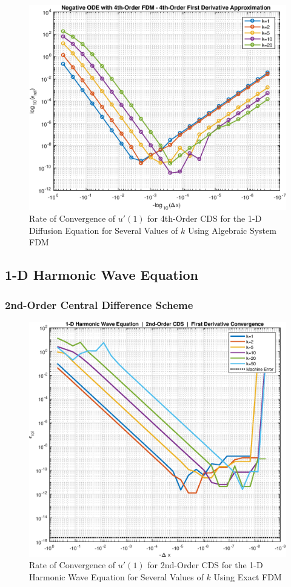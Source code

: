 \documentclass[10pt]{article}		%
\numberwithin{equation}{section}
\begin{document}
\begin{figure}[H]
	\begin{center}
		\includegraphics[width = 0.5\linewidth]{negative_ode_order_4_fd_order_4}
		\caption{Rate of Convergence of $u'(1)$ for 4th-Order CDS for the 1-D Diffusion Equation for Several Values of $k$ Using Algebraic System FDM}	
	\end{center}
\end{figure}

\subsection{1-D Harmonic Wave Equation}

\subsubsection{2nd-Order Central Difference Scheme}

\begin{figure}[H]
	\begin{center}
		\includegraphics[width = 0.5\linewidth]{1dwave2oconv}
		\caption{Rate of Convergence of $u'(1)$ for 2nd-Order CDS for the 1-D Harmonic Wave Equation for Several Values of $k$ Using Exact FDM}	
	\end{center}
\end{figure}
\end{document}
